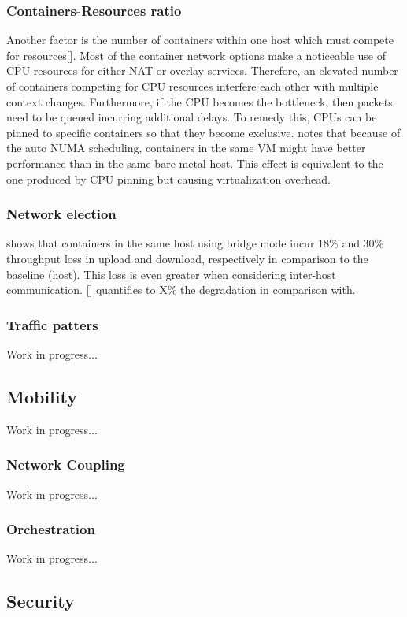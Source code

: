 \documentclass[conference]{IEEEtran}
\begin{document}
\subsubsection{Containers-Resources ratio}
Another factor is the number of containers within one host which must compete for resources[]. Most of the container network options make a noticeable use of CPU resources for either NAT or overlay services. Therefore, an elevated number of containers competing for CPU resources interfere each other with multiple context changes. Furthermore, if the CPU becomes the bottleneck, then packets need to be queued incurring additional delays. To remedy this, CPUs can be pinned to specific containers so that they become exclusive. \cite{HotConNet_17:Zhao} notes that because of the auto NUMA scheduling, containers in the same VM might have better performance than in the same bare metal host. This effect is equivalent to the one produced by CPU pinning but causing virtualization overhead.
\subsubsection{Network election}
\cite{IEEE_INFOCOM_2018:K. Suo} shows that containers in the same host using bridge mode incur 18\% and 30\% throughput loss in upload and download, respectively in comparison to the baseline (host). This loss is even greater when considering inter-host communication. [] quantifies to X\% the degradation in comparison with.

\subsubsection{Traffic patters}
Work in progress...

\subsection{Mobility}
Work in progress...

\subsubsection{Network Coupling}
Work in progress...

\subsubsection{Orchestration}
Work in progress...

\subsection{Security}
\end{document}
